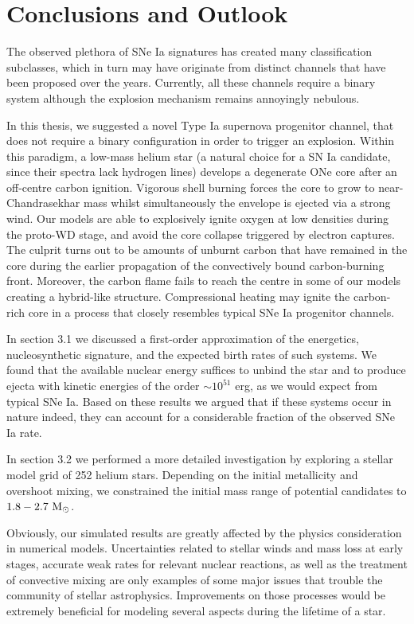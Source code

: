 \documentclass[../../main/thesis_msc.tex]{subfiles}
\begin{document}
	\chapter{Conclusions and Outlook}
	
		The observed plethora of SNe Ia signatures has created many classification subclasses, which in turn may have originate from distinct channels that have been proposed over the years. Currently, all these channels require a binary system although the explosion mechanism remains annoyingly nebulous. 


		In this thesis, we suggested a novel Type Ia supernova progenitor channel, that does not require a binary configuration in order to trigger an explosion. Within this paradigm, a low-mass helium star (a natural choice for a SN Ia candidate, since their spectra lack hydrogen lines) develops a degenerate ONe core after an off-centre carbon ignition. Vigorous shell burning forces the core to grow to near-Chandrasekhar mass whilst simultaneously the envelope is ejected via a strong wind. Our models are able to explosively ignite oxygen at low densities during the proto-WD stage, and avoid the core collapse triggered by electron captures. The culprit turns out to be amounts of unburnt carbon that have remained in the core during the earlier propagation of the convectively bound carbon-burning front.
		Moreover, the carbon flame fails to reach the centre in some of our models creating a hybrid-like structure. Compressional heating may ignite the carbon-rich core in a process that closely resembles typical SNe Ia progenitor channels.
		
		
		In section 3.1 we discussed a first-order approximation of the energetics, nucleosynthetic signature, and the expected birth rates of such systems. We found that the available nuclear energy suffices to unbind the star and to produce ejecta with kinetic energies of the order $\sim 10^{51}$ erg, as we would expect from typical SNe Ia. Based on these results we argued that if these systems occur in nature indeed, they can account for a considerable fraction of the observed SNe Ia rate.
		
		In section 3.2 we performed a more detailed investigation by exploring a stellar model grid of 252 helium stars. Depending on the initial metallicity and overshoot mixing, we constrained the initial mass range of potential candidates to $\rm 1.8 - 2.7 \ M_{\odot}$.
		
		
		Obviously, our simulated results are greatly affected by the physics consideration in numerical models. Uncertainties related to stellar winds and mass loss at early stages, accurate weak rates for relevant nuclear reactions, as well as the treatment of convective mixing are only examples of some major issues that trouble the community of stellar astrophysics. Improvements on those processes would be extremely beneficial for modeling several aspects during the lifetime of a star.
		
\end{document}
